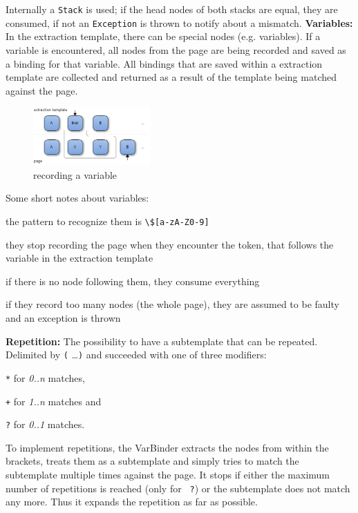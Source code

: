 Internally a \texttt{Stack} is used; if the head nodes of both stacks are equal, they are consumed, if not an \texttt{Exception} is thrown to notify about a mismatch.\newline
\textbf{Variables:}
In the extraction template, there can be special nodes (e.g. variables). 
If a variable is encountered, all nodes from the page are being recorded and saved as a binding for that variable. 
All bindings that are saved within a extraction template are collected and returned as a result of the template being matched against the page.
\begin{figure}[h]
\centering
\includegraphics[width=0.4\textwidth]{../images/varbinding}
\caption{recording a variable}
\label{fig:varbinding}
\end{figure}
Some short notes about variables:
\begin{compactitem}
\item the pattern to recognize them is \texttt{\textbackslash\$[a-zA-Z0-9]}
\item they stop recording the page when they encounter the token, that follows the variable in the extraction template
\item if there is no node following them, they consume everything
\item if they record too many nodes (the whole page), they are assumed to be faulty and an exception is thrown
\end{compactitem}
\textbf{Repetition:}
The possibility to have a subtemplate that can be repeated. 
Delimited by \texttt{(} \ldots \texttt{)} and succeeded with one of three modifiers:
\begin{compactitem}
\item \texttt{*} for \textit{0..n} matches,
\item \texttt{+} for \textit{1..n} matches and 
\item \texttt{?} for \textit{0..1} matches.
\end{compactitem}
To implement repetitions, the VarBinder extracts the nodes from within the brackets, treats them as a subtemplate and simply tries to match the subtemplate multiple times against the page. It stops if either the maximum number of repetitions is reached (only for \texttt{ ?}) or the subtemplate does not match any more. Thus it expands the repetition as far as possible.

